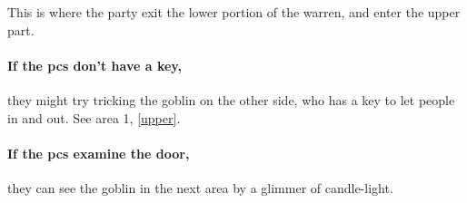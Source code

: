 \begin{multicols}{2}
{\begin{boxtext}
  \end{boxtext}
}{
  This is where the party exit the lower portion of the warren, and enter the upper part.

  \paragraph{If the \glspl{pc} don't have a key,}
  they might try tricking the goblin on the other side, who has a key to let people in and out.
  See area 1, \autoref{upper}.

  \paragraph{If the \glspl{pc} examine the door,}
  they can see the goblin in the next area by a glimmer of candle-light.
}

\end{multicols}
